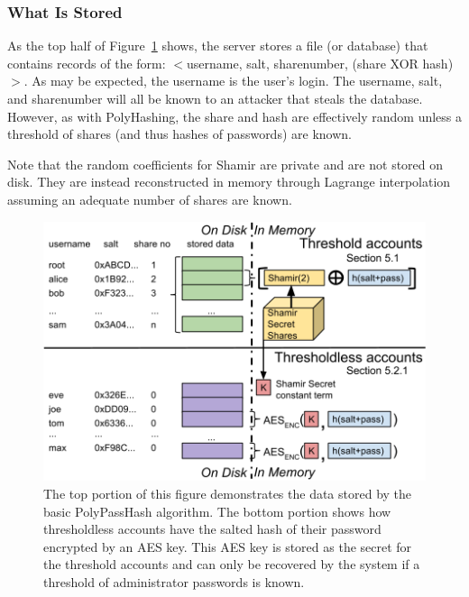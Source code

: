 \subsubsection{What Is Stored}

As the top half of Figure~\ref{fig-polypasshashoverview} shows, the server 
stores a file (or database) that contains records of the form:
$<$username, salt, sharenumber, (share XOR hash)$>$.   As may be 
expected, the username is the user's login.   The username, salt, and 
sharenumber
will all be known to an attacker that steals the database.   However,
as with PolyHashing, the share and hash are effectively random 
unless a threshold of shares (and thus hashes of passwords) are
known.

Note that the random coefficients for Shamir are private and are not stored on 
disk.   They are instead reconstructed in memory through Lagrange 
interpolation assuming an adequate number of shares are known.

\begin{figure}
\center
\begin{minipage}[b]{1.05\linewidth}
\includegraphics[width=\columnwidth]{figures/polypasshashoverview.png}
\end{minipage}
\caption{The top portion of this figure demonstrates the data stored
by the basic PolyPassHash algorithm.   The bottom portion shows how
thresholdless accounts have the salted hash of their password
encrypted by an AES key.   This AES key is stored as the secret for the 
threshold accounts and can only be recovered by the system if a threshold
of administrator passwords is known.}
\label{fig-polypasshashoverview}
\end{figure}


